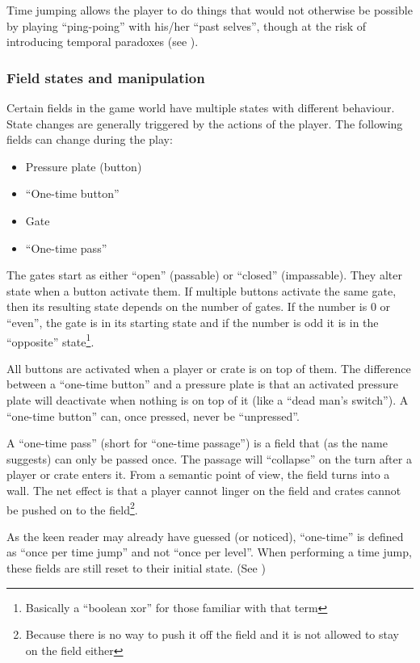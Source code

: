 Time jumping allows the player to do things that would not otherwise
be possible by playing ``ping-poing'' with his/her ``past selves'',
though at the risk of introducing temporal paradoxes (see
).

\subsubsection{Field states and manipulation}
\label{field-states}
Certain fields in the game world have multiple states with different
behaviour.  State changes are generally triggered by the actions of
the player.  The following fields can change during the play:

\begin{itemize}
\item Pressure plate (button)
\item ``One-time button''
\item Gate
\item ``One-time pass''
\end{itemize}

The gates start as either ``open'' (passable) or ``closed''
(impassable).  They alter state when a button activate them.  If
multiple buttons activate the same gate, then its resulting state
depends on the number of gates.  If the number is 0 or ``even'', the
gate is in its starting state and if the number is odd it is in the
``opposite'' state\footnote{Basically a ``boolean xor'' for those
  familiar with that term}.

All buttons are activated when a player or crate is on top of them.
The difference between a ``one-time button'' and a pressure plate is
that an activated pressure plate will deactivate when nothing is on
top of it (like a ``dead man's switch'').  A ``one-time button'' can,
once pressed, never be ``unpressed''.

A ``one-time pass'' (short for ``one-time passage'') is a field that
(as the name suggests) can only be passed once.  The passage will
``collapse'' on the turn after a player or crate enters it.  From a
semantic point of view, the field turns into a wall.  The net effect
is that a player cannot linger on the field and crates cannot be pushed
on to the field\footnote{Because there is no way to push it off the field
and it is not allowed to stay on the field either}.

As the keen reader may already have guessed (or noticed), ``one-time''
is defined as ``once per time jump'' and not ``once per level''.  When
performing a time jump, these fields are still reset to their initial
state.  (See )



